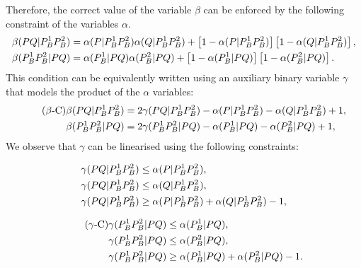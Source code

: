 \documentclass[a4paper,  review, authoryear, 1p., doubleblind]{elsarticle}
\begin{document}
	Therefore, the correct value of the variable $\beta$ can be enforced by the following constraint of the variables $\alpha$.
	\begin{align*}%
		\betamas{P}{Q}{P_B^1}{P_B^2}&=\alphamas{P}{P_B^1}{P_B^2}\alphamas{Q}{P_B^1}{P_B^2} + \left[1-\alphamas{P}{P_B^1}{P_B^2}\right]\left[1-\alphamas{Q}{P_B^1}{P_B^2}\right],\\
		\betamas{P_B^1}{P_B^2}{P}{Q}&=\alphamas{P_B^1}{P}{Q}\alphamas{P_B^2}{P}{Q} + \left[1-\alphamas{P_B^1}{P}{Q}\right]\left[1-\alphamas{P_B^2}{P}{Q}\right].
	\end{align*}
	This condition can be equivalently written using an auxiliary binary variable $\gamma$ that models the product of the $\alpha$ variables:
	\begin{align*}\tag{$\beta$-C}\label{eq:betaC}
		\beta(PQ|P_B^1P_B^2)&=2\gamma(PQ|P_B^1P_B^2) -\alpha(P|P_B^1P_B^2)-\alpha(Q|P_B^1P_B^2)+1,\\
		\beta(P_B^1P_B^2|PQ)&=2\gamma(P_B^1P_B^2|PQ) -\alpha(P_B^1|PQ)-\alpha(P_B^2|PQ)+1,
	\end{align*}
	We observe that $\gamma$ can be linearised using the following constraints:
	
	\begin{minipage}{.5\linewidth}
		\begin{align*}
			\gamma(PQ|P_B^1P_B^2) & \leq \alpha(P|P_B^1P_B^2),\\
			\gamma(PQ|P_B^1P_B^2) & \leq \alpha(Q|P_B^1P_B^2),\\
			\gamma(PQ|P_B^1P_B^2) & \geq \alpha(P|P_B^1P_B^2) + \alpha(Q|P_B^1P_B^2) - 1,
		\end{align*}
	\end{minipage}
	\begin{minipage}{.5\linewidth}
		\begin{align*}\tag{$\gamma$-C}\label{eq:gammaC}
			\gamma(P_B^1P_B^2|PQ) & \leq \alpha(P_B^1|PQ),\\
			\gamma(P_B^1P_B^2|PQ) & \leq \alpha(P_B^2|PQ),\\
			\gamma(P_B^1P_B^2|PQ) & \geq \alpha(P_B^1|PQ) + \alpha(P_B^2|PQ) - 1.
		\end{align*}
	\end{minipage}
	
	\bigskip
	
	\newcommand{\deltacheck}[4]{\delta(#1#2|#3#4)}
	
\end{document}
